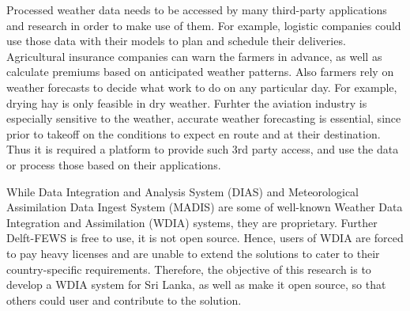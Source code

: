 Processed weather data needs to be accessed by many third-party applications and research in order to make use of them. For example, logistic companies could use those data with their models to plan and schedule their deliveries. Agricultural insurance companies can warn the farmers in advance, as well as calculate premiums based on anticipated weather patterns. Also farmers rely on weather forecasts to decide what work to do on any particular day. For example, drying hay is only feasible in dry weather. Furhter the aviation industry is especially sensitive to the weather, accurate weather forecasting is essential, since prior to takeoff on the conditions to expect en route and at their destination. 
Thus it is required a platform to provide such 3rd party access, and use the data or process those based on their applications.

While Data Integration and Analysis System (DIAS) and Meteorological Assimilation Data Ingest System (MADIS) are some of well-known Weather Data Integration and Assimilation (WDIA) systems, they are proprietary. Further Delft-FEWS is free to use, it is not open source. Hence, users of WDIA are forced to pay heavy licenses and are unable to extend the solutions to cater to their country-specific requirements. Therefore, the objective of this research is to develop a WDIA system for Sri Lanka, as well as make it open source, so that others could user and contribute to the solution.



